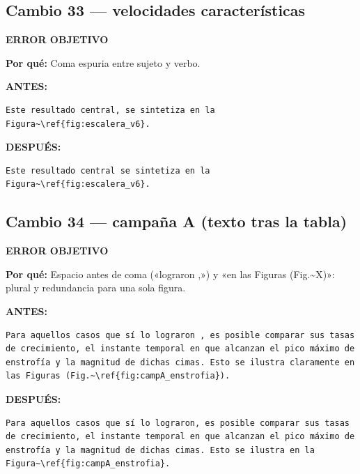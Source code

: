 \documentclass[11pt,a4paper]{article}
\begin{document}
\subsection*{Cambio 33 --- velocidades características}
\colorbox{okbg}{\textbf{\footnotesize ERROR OBJETIVO}}

\textbf{Por qué:} Coma espuria entre sujeto y verbo.

\textcolor{antesline}{\textbf{ANTES:}}
\begin{Verbatim}[breaklines=true, breakanywhere=true, fontsize=\small, frame=leftline, rulecolor=\color{antesline}, framerule=1.2pt]
Este resultado central, se sintetiza en la Figura~\ref{fig:escalera_v6}.
\end{Verbatim}
\textcolor{despline}{\textbf{DESPUÉS:}}
\begin{Verbatim}[breaklines=true, breakanywhere=true, fontsize=\small, frame=leftline, rulecolor=\color{despline}, framerule=1.2pt]
Este resultado central se sintetiza en la Figura~\ref{fig:escalera_v6}.
\end{Verbatim}

\subsection*{Cambio 34 --- campaña A (texto tras la tabla)}
\colorbox{okbg}{\textbf{\footnotesize ERROR OBJETIVO}}

\textbf{Por qué:} Espacio antes de coma («lograron ,») y «en las Figuras (Fig.\textasciitilde{}X)»: plural y redundancia para una sola figura.

\textcolor{antesline}{\textbf{ANTES:}}
\begin{Verbatim}[breaklines=true, breakanywhere=true, fontsize=\small, frame=leftline, rulecolor=\color{antesline}, framerule=1.2pt]
Para aquellos casos que sí lo lograron , es posible comparar sus tasas de crecimiento, el instante temporal en que alcanzan el pico máximo de enstrofía y la magnitud de dichas cimas. Esto se ilustra claramente en las Figuras (Fig.~\ref{fig:campA_enstrofia}).
\end{Verbatim}
\textcolor{despline}{\textbf{DESPUÉS:}}
\begin{Verbatim}[breaklines=true, breakanywhere=true, fontsize=\small, frame=leftline, rulecolor=\color{despline}, framerule=1.2pt]
Para aquellos casos que sí lo lograron, es posible comparar sus tasas de crecimiento, el instante temporal en que alcanzan el pico máximo de enstrofía y la magnitud de dichas cimas. Esto se ilustra en la Figura~\ref{fig:campA_enstrofia}.
\end{Verbatim}
\end{document}
